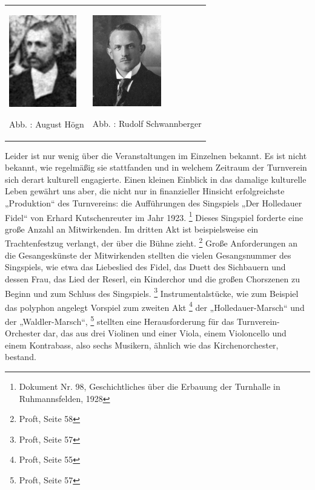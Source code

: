 \documentclass[a4paper]{article}
\newcounter{Abb}
\renewcommand\theAbb{\arabic{Abb}}
\begin{document}
\begin{center}
\begin{minipage}{6.682cm}
\begin{flushleft}
\tablefirsthead{}
\tablehead{}
\tabletail{}
\tablelasttail{}
\begin{supertabular}{m{3.1069999cm}m{3.174cm}}

\includegraphics[width=2.925cm,height=4.001cm]{pictures/zulassungsarbeit-img019.jpg}

Abb. \stepcounter{Abb}{\theAbb}: August Högn &

\includegraphics[width=2.992cm,height=3.993cm]{pictures/zulassungsarbeit-img020.jpg}

Abb. \stepcounter{Abb}{\theAbb}: Rudolf Schwannberger\\
\end{supertabular}
\end{flushleft}
\end{minipage}
\end{center}
Leider ist nur wenig über die Veranstaltungen im Einzelnen bekannt. Es
ist nicht bekannt, wie regelmäßig sie stattfanden und in welchem
Zeitraum der Turnverein sich derart kulturell engagierte. Einen kleinen
Einblick in das damalige kulturelle Leben gewährt uns aber, die nicht
nur in finanzieller Hinsicht erfolgreichste „Produktion“ des
Turnvereins: die Aufführungen des Singspiels „Der Holledauer Fidel“ von
Erhard Kutschenreuter im Jahr 1923. \footnote{Dokument Nr. 98,
Geschichtliches über die Erbauung der Turnhalle in Ruhmannsfelden,
1928} Dieses Singspiel forderte eine große Anzahl an Mitwirkenden. Im
dritten Akt ist beispielsweise ein Trachtenfestzug verlangt, der über
die Bühne zieht. \footnote{Proft, Seite 58} Große Anforderungen an die
Gesangeskünste der Mitwirkenden stellten die vielen Gesangsnummer des
Singspiels, wie etwa das Liebeslied des Fidel, das Duett des Sichbauern
und dessen Frau, das Lied der Reserl, ein Kinderchor und die großen
Chorszenen zu Beginn und zum Schluss des Singspiels. \footnote{Proft,
Seite 57} Instrumentalstücke, wie zum Beispiel das polyphon angelegt
Vorspiel zum zweiten Akt \footnote{Proft, Seite 55} der
„Holledauer-Marsch“ und der „Waldler-Marsch“, \footnote{Proft, Seite
57} stellten eine Herausforderung für das Turnverein-Orchester dar, das
aus drei Violinen und einer Viola, einem Violoncello und einem
Kontrabass, also sechs Musikern, ähnlich wie das Kirchenorchester,
bestand.
\end{document}
